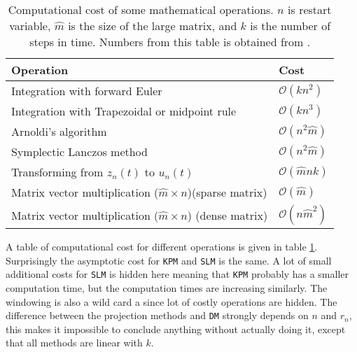 \begin{table}
\begin{tabular}{l l }
Operation & Cost \\
\hline
Integration with forward Euler & $\mathcal{O}(k n^2)$ \\
Integration with Trapezoidal or midpoint rule & $\mathcal{O}(k n^3)$ \\
Arnoldi's algorithm & $ \mathcal{ O }(n^2 \hat{m})$ \\
Symplectic Lanczos method & $ \mathcal{O}(n^2 \hat{m}) $\\
Transforming from $z_n(t)$ to $u_n(t)$ & $ \mathcal{O}(\hat{m}nk) $\\
Matrix vector multiplication ($\hat{m}\times n$)(sparse matrix) & $ \mathcal{O}(\hat{m}) $ \\
Matrix vector multiplication ($\hat{m}\times n$) (dense matrix) & $ \mathcal{O}(n \hat{m}^2) $
\end{tabular}

\caption{Computational cost of some mathematical operations. $n$ is restart variable, $\hat{m}$ is the size of the large matrix, and $k$ is the number of steps in time. Numbers from this table is obtained from \cite{complex}. }
\label{tab:cd}
\end{table}

A table of computational cost for different operations is given in table \ref{tab:cd}. \\
Surprisingly the asymptotic cost for \texttt{KPM} and \texttt{SLM} is the same. A lot of small additional costs for \texttt{SLM} is hidden here meaning that \texttt{KPM} probably has a smaller computation time, but the computation times are increasing similarly. The windowing is also a wild card a since lot of costly operations are hidden. The difference between the projection methods and \texttt{DM} strongly depends on $n$ and $r_n$, this makes it impossible to conclude anything without actually doing it, except that all methods are linear with $k$. \\

